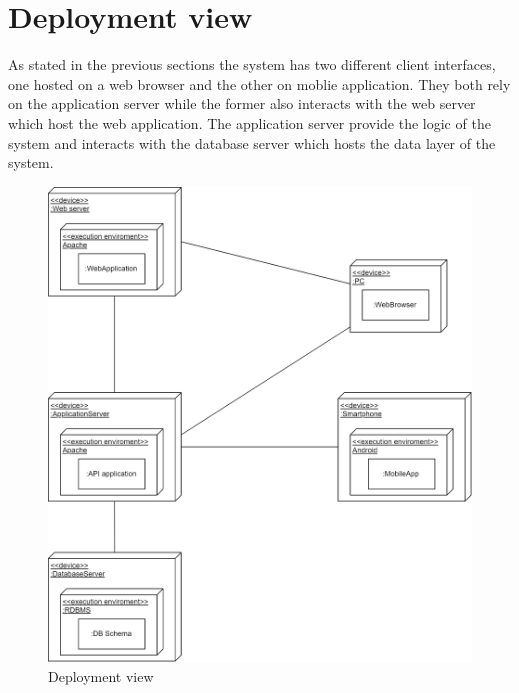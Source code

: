 \section{Deployment view}
As stated in the previous sections the system has two different client interfaces, one hosted on a web browser and the other on moblie application. They both rely on the application server while the former also interacts with the web server which host the web application.
The application server provide the logic of the system and interacts with the database server which hosts the data layer of the system.
\begin{figure}[H]
\caption{Deployment view}
\centering
\includegraphics[width = \textwidth]{sections/architecturalDesign/DeploymentView.png}
\end{figure}
